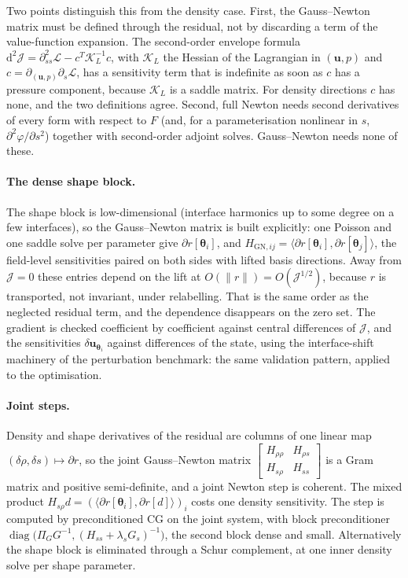 \documentclass[11pt]{article}
\newcommand{\Jf}{\mathscr{J}}  %
\newcommand{\bu}{\mathbf{u}}
\newcommand{\norm}[1]{\lVert #1 \rVert}
\newcommand{\ip}[2]{\langle #1, #2\rangle}
\begin{document}
Two points distinguish this from the density case. First, the
Gauss--Newton matrix must be defined through the residual, not by
discarding a term of the value-function expansion. The second-order
envelope formula $\mathrm{d}^2\Jf  = \partial^2_{ss}\mathcal{L} -
c^{T}\mathcal{K}_L^{-1}c$, with $\mathcal{K}_L$ the Hessian of the
Lagrangian in $(\bu,p)$ and $c = \partial_{(\bu,p)}\partial_s\mathcal{L}$,
has a sensitivity term that is indefinite as soon as $c$ has a pressure
component, because $\mathcal{K}_L$ is a saddle matrix. For density
directions $c$ has none, and the two definitions agree. Second, full
Newton needs second derivatives of every form with respect to $F$ (and,
for a parameterisation nonlinear in $s$, $\partial^2\varphi/\partial s^2$)
together with second-order adjoint solves. Gauss--Newton needs none of
these.

\paragraph{The dense shape block.} The shape block is low-dimensional
(interface harmonics up to some degree on a few interfaces), so the
Gauss--Newton matrix is built explicitly: one Poisson and one saddle
solve per parameter give $\partial r[\bm{\theta}_i]$, and
$H_{\mathrm{GN},ij} = \ip{\partial r[\bm{\theta}_i]}{\partial
r[\bm{\theta}_j]}$, the field-level sensitivities paired on both sides
with lifted basis directions. Away from $\Jf  = 0$ these entries depend on
the lift at $O(\norm{r}) = O(\Jf ^{1/2})$, because $r$ is transported, not
invariant, under relabelling. That is the same order as the neglected
residual term, and the dependence disappears on the zero set. The
gradient is checked coefficient by coefficient against central
differences of $\Jf $, and the sensitivities $\delta\bu_{\bm{\theta}_i}$
against differences of the state, using the interface-shift machinery
of the perturbation benchmark: the same validation pattern, applied to
the optimisation.

\paragraph{Joint steps.} Density and shape derivatives of the residual
are columns of one linear map $(\delta\rho,\delta s)\mapsto\partial r$, so
the joint Gauss--Newton matrix
$\begin{bmatrix}H_{\rho\rho} & H_{\rho s}\\ H_{s\rho} & H_{ss}\end{bmatrix}$
is a Gram matrix and positive semi-definite, and a joint Newton step is
coherent. The mixed product $H_{s\rho}d = (\ip{\partial r[\bm{\theta}_i]}
{\partial r[d]})_i$ costs one density sensitivity. The step is computed by
preconditioned CG on the joint system, with block preconditioner
$\operatorname{diag}\bigl(\Pi_GG^{-1}, (H_{ss} + \lambda_sG_s)^{-1}\bigr)$,
the second block dense and small. Alternatively the shape block is
eliminated through a Schur complement, at one inner density solve per
shape parameter.
\end{document}
